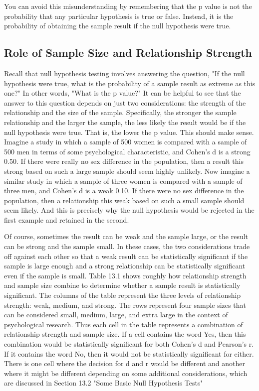 You can avoid this misunderstanding by remembering that the p value is not the probability that any particular hypothesis is true or false. Instead, it is the probability of obtaining the sample result if the null hypothesis were true.



\subsection{Role of Sample Size and Relationship Strength}




Recall that null hypothesis testing involves answering the question, "If the null hypothesis were true, what is the probability of a sample result as extreme as this one?" In other words, "What is the p value?" It can be helpful to see that the answer to this question depends on just two considerations: the strength of the relationship and the size
of the sample. Specifically, the stronger the sample relationship and the larger the sample, the less likely the result would be if the null hypothesis were true. That is, the lower the p value. This should make sense. Imagine a study in which a sample of 500 women is compared with a sample of 500 men in terms of some psychological characteristic, and Cohen's d is a strong 0.50. If there were really no sex difference in the population, then a result this strong based on such a large sample should seem highly unlikely. Now imagine a similar study in which a sample of three women is compared with a sample of three men, and Cohen's d is a weak 0.10. If there were no sex difference in the population, then a relationship this weak based on such a small sample should seem likely. And this is precisely why the null hypothesis would be rejected in the first example and retained in the second.




Of course, sometimes the result can be weak and the sample large, or the result can be strong and the sample small. In these cases, the two considerations trade off against each other so that a weak result can be statistically significant if the sample is large enough and a strong relationship can be statistically significant even if the sample is small. Table 13.1 shows roughly how relationship strength and sample size combine to determine whether a sample result is statistically significant. The columns of the table represent the three levels of relationship strength: weak, medium, and strong. The rows represent four sample sizes that can be considered small, medium, large, and extra large in the context of psychological research. Thus each cell in the table represents a combination of relationship strength and sample size. If a cell contains the word Yes, then this combination would be statistically significant for both Cohen's d and Pearson's r. If it contains the word No, then it would not be statistically significant for either. There is one cell where the decision for d and r would be different and another where it might be different depending on some additional considerations, which are discussed in Section 13.2 "Some Basic Null Hypothesis Tests"




